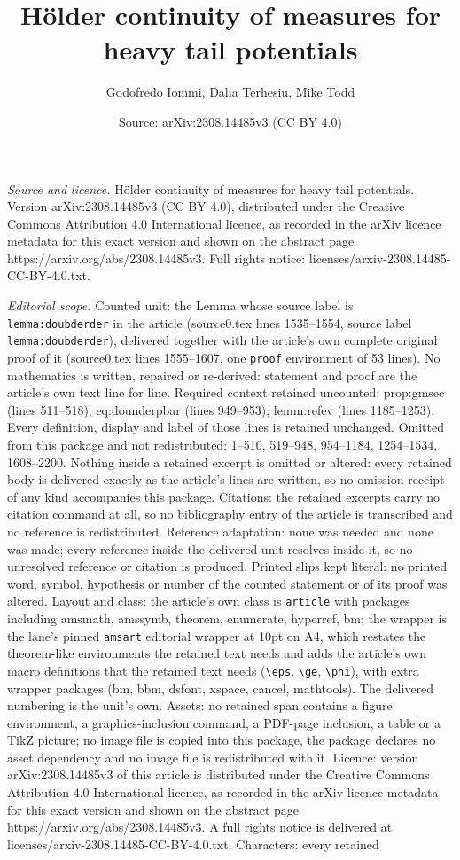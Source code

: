 \documentclass[10pt,a4paper]{amsart}
\title[H\"older continuity of measures for heavy tail potentials]{H\"older continuity of measures for heavy tail potentials}
\author{Godofredo Iommi, Dalia Terhesiu, Mike Todd}
\date{Source: arXiv:2308.14485v3 (CC BY 4.0)}
\begin{document}
\maketitle

\noindent\emph{Source and licence.} H\"older continuity of measures for heavy tail potentials. Version arXiv:2308.14485v3 (CC BY 4.0), distributed under the Creative Commons Attribution 4.0 International licence, as recorded in the arXiv licence metadata for this exact version and shown on the abstract page https://arxiv.org/abs/2308.14485v3. Full rights notice: licenses/arxiv-2308.14485-CC-BY-4.0.txt.\par\smallskip

\noindent\textit{Editorial scope.} Counted unit: the Lemma whose source label is \texttt{lemma:doubderder} in the article (source0.tex lines 1535--1554, source label \texttt{lemma:doubderder}), delivered together with the article's own complete original proof of it (source0.tex lines 1555--1607, one \texttt{proof} environment of 53 lines). No mathematics is written, repaired or re-derived: statement and proof are the article's own text line for line. Required context retained uncounted: prop:gmsec (lines 511--518); eq:dounderpbar (lines 949--953); lemm:refev (lines 1185--1253). Every definition, display and label of those lines is retained unchanged. Omitted from this package and not redistributed: 1--510, 519--948, 954--1184, 1254--1534, 1608--2200. Nothing inside a retained excerpt is omitted or altered: every retained body is delivered exactly as the article's lines are written, so no omission receipt of any kind accompanies this package. Citations: the retained excerpts carry no citation command at all, so no bibliography entry of the article is transcribed and no reference is redistributed. Reference adaptation: none was needed and none was made; every reference inside the delivered unit resolves inside it, so no unresolved reference or citation is produced. Printed slips kept literal: no printed word, symbol, hypothesis or number of the counted statement or of its proof was altered. Layout and class: the article's own class is \texttt{article} with packages including amsmath, amssymb, theorem, enumerate, hyperref, bm; the wrapper is the lane's pinned \texttt{amsart} editorial wrapper at 10pt on A4, which restates the theorem-like environments the retained text needs and adds the article's own macro definitions that the retained text needs (\texttt{\textbackslash eps}, \texttt{\textbackslash ge}, \texttt{\textbackslash phi}), with extra wrapper packages (bm, bbm, dsfont, xspace, cancel, mathtools). The delivered numbering is the unit's own. Assets: no retained span contains a figure environment, a graphics-inclusion command, a PDF-page inclusion, a table or a TikZ picture; no image file is copied into this package, the package declares no asset dependency and no image file is redistributed with it. Licence: version arXiv:2308.14485v3 of this article is distributed under the Creative Commons Attribution 4.0 International licence, as recorded in the arXiv licence metadata for this exact version and shown on the abstract page https://arxiv.org/abs/2308.14485v3. A full rights notice is delivered at licenses/arxiv-2308.14485-CC-BY-4.0.txt. Characters: every retained 
\end{document}

